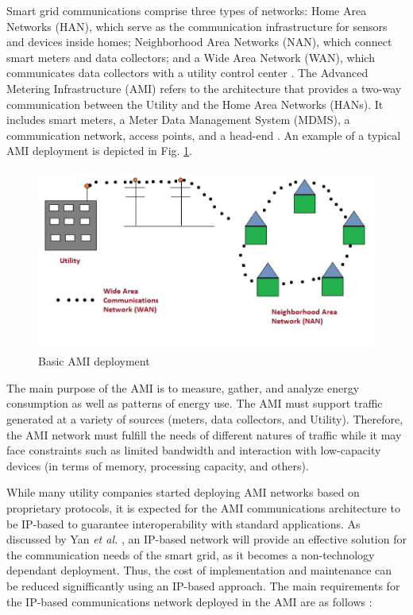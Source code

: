 \documentclass[11pt,draftclsnofoot,onecolumn]{IEEEtran}
\begin{document}
Smart grid communications comprise three types of networks: Home Area Networks (HAN), which serve as the communication infrastructure for sensors and devices inside homes; Neighborhood Area Networks (NAN), which connect smart meters and data collectors; and a Wide Area Network (WAN), which communicates data collectors with a utility control center  \cite{Tang2010}. The Advanced Metering Infrastructure (AMI) refers to the architecture that provides a two-way communication between the Utility and the Home Area Networks (HANs). It includes smart meters, a Meter Data Management System (MDMS), a communication network, access points, and a head-end  \cite{Wang2011b} \cite{Bennett2008}. An example of a typical AMI deployment is depicted in Fig. \ref{fig:ami}.

\begin{figure}[htp!]
\centering
\includegraphics [height=6cm] {basicAMI}
\caption{Basic AMI deployment}
\label{fig:ami}
\end{figure}

The main purpose of the AMI is to measure, gather, and analyze energy consumption as well as patterns of energy use.  The AMI must support  traffic generated at a variety of sources (meters, data collectors, and Utility). Therefore, the AMI network must fulfill %
the needs of different natures of traffic while it may face constraints such as limited bandwidth and interaction with low-capacity devices (in terms of memory, processing capacity, and others).

While many utility companies started deploying AMI networks based on proprietary protocols, it is expected for the AMI communications architecture to be IP-based to guarantee interoperability with standard applications. As discussed by Yan \textit{et al.} \cite{Yan2013}, an IP-based network will provide an effective solution for the communication needs of the smart grid, as it becomes a non-technology dependant deployment.  Thus, the cost of implementation and maintenance can be reduced signifficantly using an IP-based approach. The main requirements for the IP-based communications network deployed in the AMI are as follows \cite{Wang2011b} \cite{Iyer2011a}:
\end{document}
